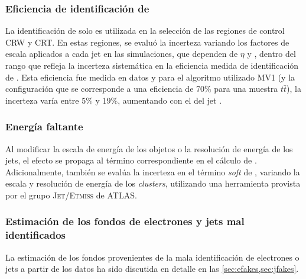 



\subsubsection{Eficiencia de identificación de {\bjets}}

La identificación de {\bjets} solo es utilizada en la selección de las regiones
de control CRW y CRT. En estas regiones, se evaluó la incerteza
variando los factores de escala aplicados a cada jet en las simulaciones, que
dependen de $\eta$ y {\pt}, dentro del rango que refleja la incerteza sistemática
en la eficiencia medida de identificación de {\bjets}. Esta eficiencia fue
medida en datos y para el algoritmo utilizado MV1 (y la configuración que se
corresponde a una eficiencia de 70\% para una muestra $t\bar{t}$), la
incerteza varía entre 5\% y 19\%, aumentando con el {\pt} del jet
\cite{btagging}.



\subsubsection{Energía faltante}

Al modificar la escala de energía de los objetos o la resolución de energía de los jets, el
efecto se propaga al término correspondiente en el cálculo de {\met}.
Adicionalmente, también se evalúa la incerteza en el término \emph{soft} de {\met}, variando
la escala y resolución de energía de los \emph{clusters}, utilizando una herramienta provista por
el grupo \textsc{Jet/Etmiss} de ATLAS.


\subsubsection{Estimación de los fondos de electrones y jets mal identificados}

La estimación de los fondos provenientes de la mala identificación de electrones
o jets a partir de los datos ha sido discutida en detalle en las \cref{sec:efakes,sec:jfakes}.

